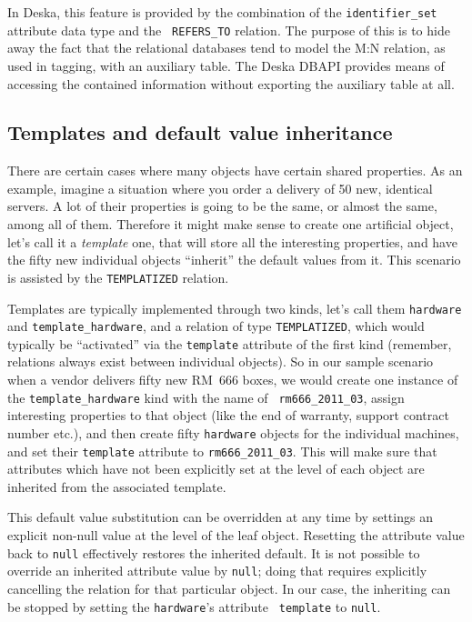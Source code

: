 \documentclass{article}
\begin{document}
In Deska, this feature is provided by the combination of the {\tt identifier\_set} attribute data type and the {\tt
REFERS\_TO} relation.  The purpose of this is to hide away the fact that the relational databases tend to model the M:N
relation, as used in tagging, with an auxiliary table.  The Deska DBAPI provides means of accessing the contained
information without exporting the auxiliary table at all.

\subsection{Templates and default value inheritance}

There are certain cases where many objects have certain shared properties.  As an example, imagine a situation where you
order a delivery of 50 new, identical servers.  A lot of their properties is going to be the same, or almost the same,
among all of them.  Therefore it might make sense to create one artificial object, let's call it a {\em template} one,
that will store all the interesting properties, and have the fifty new individual objects ``inherit'' the default values
from it.  This scenario is assisted by the {\tt TEMPLATIZED} relation.

Templates are typically implemented through two kinds, let's call them {\tt hardware} and {\tt template\_hardware}, and
a relation of type {\tt TEMPLATIZED}, which would typically be ``activated'' via the {\tt template} attribute of the
first kind (remember, relations always exist between individual objects).  So in our sample scenario when a vendor
delivers fifty new RM~666 boxes, we would create one instance of the {\tt template\_hardware} kind with the name of {\tt
rm666\_2011\_03}, assign interesting properties to that object (like the end of warranty, support contract number etc.),
and then create fifty {\tt hardware} objects for the individual machines, and set their {\tt template} attribute to
{\tt rm666\_2011\_03}.  This will make sure that attributes which have not been explicitly set at the level of each
object are inherited from the associated template.

This default value substitution can be overridden at any time by settings an explicit non-null value at the level of the
leaf object.  Resetting the attribute value back to {\tt null} effectively restores the inherited default.  It is not
possible to override an inherited attribute value by {\tt null}; doing that requires explicitly cancelling the relation
for that particular object.  In our case, the inheriting can be stopped by setting the {\tt hardware}'s attribute {\tt
template} to {\tt null}.
\end{document}
